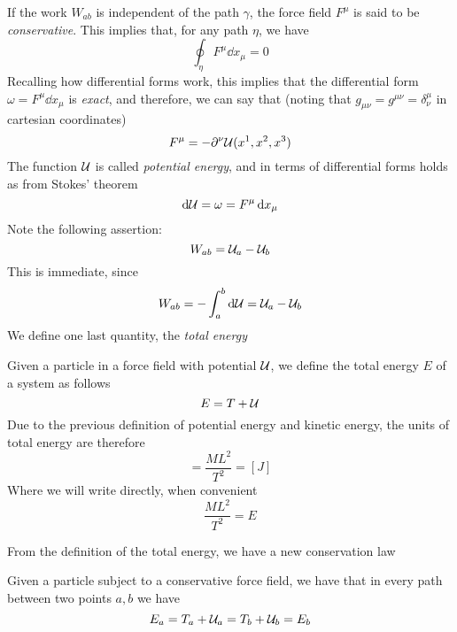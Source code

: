 \documentclass[../admech.tex]{subfiles}
\begin{document}
If the work $W_{ab}$ is independent of the path $\gamma$, the force field $F^\mu$ is said to be \emph{conservative}. This implies that, for any path $\eta$, we have
\begin{equation}
	\oint_\eta F^\mu\dd{x_\mu}=0
	\label{eq:consfiled}
\end{equation}
Recalling how differential forms work, this implies that the differential form $\omega=F^\mu\dd{x_\mu}$ is \emph{exact}, and therefore, we can say that (noting that $g_{\mu\nu}=g^{\mu\nu}=\delta^\mu_\nu$ in cartesian coordinates)
\begin{equation}
	F^\mu=-\partial^\nu\mathcal{U}(x^1,x^2,x^3)
	\label{eq:poten1}
\end{equation}
The function $\mathcal{U}$ is called \emph{potential energy}, and in terms of differential forms holds as from Stokes' theorem
\begin{equation}
	\dd{\mathcal{U}}=\omega=F^\mu\dd{x_\mu}
	\label{eq:potstokes}
\end{equation}
Note the following assertion:
\begin{equation}
	W_{ab}=\mathcal{U}_a-\mathcal{U}_b
	\label{eq:workpot}
\end{equation}
This is immediate, since
\begin{equation}
	W_{ab}=-\int_{a}^{b}\dd{\mathcal{U}}=\mathcal{U}_a-\mathcal{U}_b
	\label{eq:workpot2}
\end{equation}
We define one last quantity, the \emph{total energy}
\begin{dfn}
	Given a particle in a force field with potential $\mathcal{U}$, we define the total energy $E$ of a system as follows
	\begin{equation}
		E=T+\mathcal{U}
		\label{eq:totmen}
	\end{equation}
	Due to the previous definition of potential energy and kinetic energy, the units of total energy are therefore
	\begin{equation*}
		[E]=\frac{ML^2}{T^2}=[J]
	\end{equation*}
	Where we will write directly, when convenient
	\begin{equation*}
		\frac{ML^2}{T^2}=E
	\end{equation*}
\end{dfn}
From the definition of the total energy, we have a new conservation law
\begin{thm}
	Given a particle subject to a conservative force field, we have that in every path between  two points $a,b$ we have
	\begin{equation*}
		E_a=T_a+\mathcal{U}_a=T_b+\mathcal{U}_b=E_b
	\end{equation*}
\end{thm}
\end{document}

